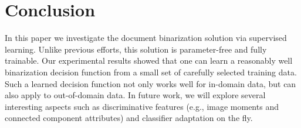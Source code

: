 \documentclass[onecolumn,11pt,draftcls,journal]{IEEEtran}
\begin{document}
\section{Conclusion}
In this paper we investigate the document binarization solution via supervised learning. Unlike previous efforts, this solution is parameter-free and fully trainable. Our experimental results showed that one can learn a reasonably well binarization decision function from a small set of carefully selected training data. Such a learned decision function not only works well for in-domain data, but can also apply to out-of-domain data.
In future work, we will explore several interesting aspects such as discriminative features (e.g., image moments and connected component attributes) and classifier adaptation on the fly.

\ifCLASSOPTIONcaptionsoff
  \newpage
\fi
\newpage
{}
\IEEEtriggercmd{\enlargethispage{-5in}}
\end{document}
